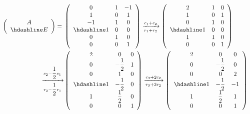 \documentclass[12pt,fontset=fandol]{ctexart}
\begin{document}
\begin{solve}
    \begin{align*}
        \left(\begin{array}{c}
            A \\ \hdashline E
        \end{array}\right) ={} & \left(\begin{array}{ccc}
            0 & 1 & -1 \\
            1 & 0 & 1  \\
            -1 & 1 & 0 \\
            \hdashline
            1 & 0 & 0 \\
            0 & 1 & 0 \\
            0 & 0 & 1
        \end{array}\right)
        \xrightarrow[r_1+r_2]{c_1+c_2} \left(\begin{array}{ccc}
            2 & 1 & 0 \\
            1 & 0 & 1  \\
            0 & 1 & 0 \\
            \hdashline
            1 & 0 & 0 \\
            1 & 1 & 0 \\
            0 & 0 & 1
        \end{array}\right) & \\
        \xrightarrow[r_2-\dfrac{1}{2}r_1]{c_2-\dfrac{1}{2}c_1} & \left(\begin{array}{ccc}
            2 & 0 & 0 \\
            0 & -\dfrac{1}{2} & 1  \\
            0 & 1 & 0 \\
            \hdashline
            1 & -\dfrac{1}{2} & 0 \\
            1 & \dfrac{1}{2} & 0 \\
            0 & 0 & 1
        \end{array}\right)
        \xrightarrow[r_3+2r_2]{c_3+2c_2} \left(\begin{array}{ccc}
            2 & 0 & 0 \\
            0 & -\dfrac{1}{2} & 0  \\
            0 & 0 & 2 \\
            \hdashline
            1 & -\dfrac{1}{2} & -1 \\
            1 & \dfrac{1}{2} & 1 \\
            0 & 0 & 1
        \end{array}\right) & \\
    \end{align*}
\end{solve}
\end{document}
